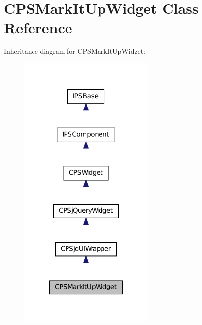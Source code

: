 \hypertarget{classCPSMarkItUpWidget}{
\section{CPSMarkItUpWidget Class Reference}
\label{classCPSMarkItUpWidget}
}


Inheritance diagram for CPSMarkItUpWidget:\nopagebreak
\begin{figure}[H]
\begin{center}
\leavevmode
\includegraphics[width=190pt]{classCPSMarkItUpWidget__inherit__graph}
\end{center}
\end{figure}


